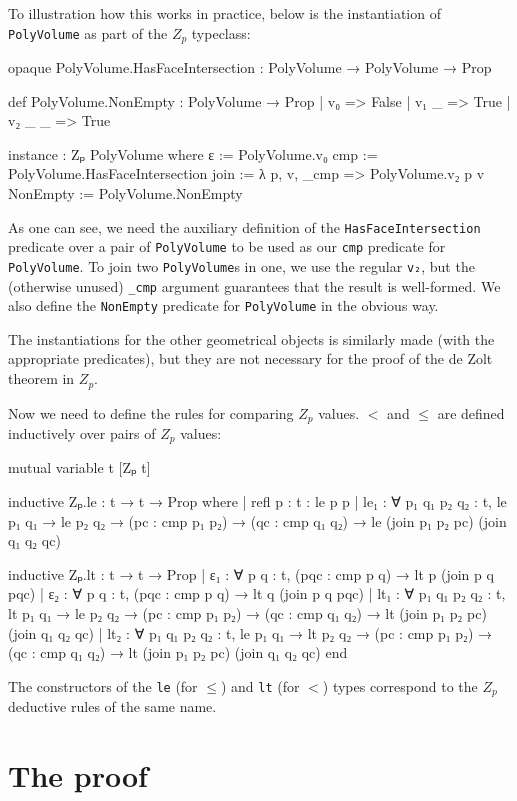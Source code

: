 \documentclass[12pt]{article} %
\newcommand{\leanline}[1]{\texttt{#1}} %
\newcommand{\pvolume}{\texttt{PolyVolume}} %
\newcommand{\zp}{\ensuremath{Z_{p}}}
\begin{document}
To illustration how this works in practice, below is the instantiation of \pvolume{} as part of the \zp{} typeclass: %
\begin{leancode}
opaque PolyVolume.HasFaceIntersection : PolyVolume → PolyVolume → Prop

def PolyVolume.NonEmpty : PolyVolume → Prop
| v₀ => False
| v₁ _ => True
| v₂ _ _ => True

instance : Zₚ PolyVolume where
  ε := PolyVolume.v₀
  cmp := PolyVolume.HasFaceIntersection
  join := λ p, v, _cmp => PolyVolume.v₂ p v
  NonEmpty := PolyVolume.NonEmpty
\end{leancode}
As one can see, we need the auxiliary definition of the \leanline{HasFaceIntersection} predicate over a pair of \pvolume{} to be used as our \leanline{cmp} predicate for \pvolume. %
To join two \pvolume{}s in one, we use the regular \leanline{v₂}, but the (otherwise unused) \leanline{_cmp} argument guarantees that the result is well-formed. %
We also define the \leanline{NonEmpty} predicate for \pvolume{} in the obvious way. %

The instantiations for the other geometrical objects is similarly made (with the appropriate predicates), but they are not necessary for the proof of the de Zolt theorem in \zp. %

Now we need to define the rules for comparing \zp{} values. %
\(<\) and \(\leq\) are defined inductively over pairs of \zp{} values: %
\begin{leancode}
mutual
  variable {t} [Zₚ t]

  inductive Zₚ.le : t → t → Prop where
  | refl {p : t} : le p p
  | le₁ : ∀ {p₁ q₁ p₂ q₂ : t}, le p₁ q₁ → le p₂ q₂
        → (pc : cmp p₁ p₂) → (qc : cmp q₁ q₂)
        → le (join p₁ p₂ pc) (join q₁ q₂ qc)

  inductive Zₚ.lt : t → t → Prop
  | ε₁ : ∀ {p q : t}, (pqc : cmp p q) → lt p (join p q pqc)
  | ε₂ : ∀ {p q : t}, (pqc : cmp p q) → lt q (join p q pqc)
  | lt₁ : ∀ {p₁ q₁ p₂ q₂ : t}, lt p₁ q₁ → le p₂ q₂
        → (pc : cmp p₁ p₂) → (qc : cmp q₁ q₂)
        → lt (join p₁ p₂ pc) (join q₁ q₂ qc)
  | lt₂ : ∀ {p₁ q₁ p₂ q₂ : t}, le p₁ q₁ → lt p₂ q₂
        → (pc : cmp p₁ p₂) → (qc : cmp q₁ q₂)
        → lt (join p₁ p₂ pc) (join q₁ q₂ qc)
end
\end{leancode}
The constructors of the \leanline{le} (for \(\leq\)) and \leanline{lt} (for \(<\)) types correspond to the \zp{} deductive rules of the same name. %

\section{The proof}\label{sec:de-zolt-theorem} %
\end{document}
